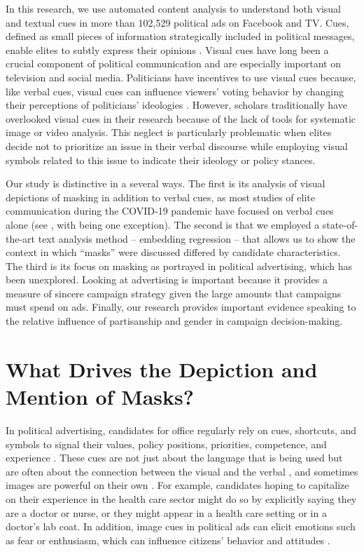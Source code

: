 In this research, we use automated content analysis to understand both visual and textual cues in more than 102,529 political ads on Facebook and TV. Cues, defined as small pieces of information strategically included in political messages, enable elites to subtly express their opinions \parencite{darmofal2005elite}. Visual cues have long been a crucial component of political communication \parencite{schill2012visual} and are especially important on television and social media. Politicians have incentives to use visual cues because, like verbal cues, visual cues can influence viewers' voting behavior by changing their perceptions of politicians' ideologies \parencite{dan_visual_2021}. However, scholars traditionally have overlooked visual cues in their research because of the lack of tools for systematic image or video analysis. This neglect is particularly problematic when elites decide not to prioritize an issue in their verbal discourse while employing visual symbols related to this issue to indicate their ideology or policy stances. 

Our study is distinctive in a several ways. The first is its analysis of visual depictions of masking in addition to verbal cues, as most studies of elite communication during the COVID-19 pandemic have focused on verbal cues alone (see \cite{green2020elusive, scoville2022mask, neumann2023politicizing}, with \cite{holman_masking_nodate} being one exception). The second is that we employed a state-of-the-art text analysis method -- embedding regression -- that allows us to show the context in which ``masks'' were discussed differed by candidate characteristics. The third is its focus on masking as portrayed in political advertising, which has been unexplored. Looking at advertising is important because it provides a measure of sincere campaign strategy given the large amounts that campaigns must spend on ads. Finally, our research provides  important evidence speaking to the relative influence of partisanship and gender in campaign decision-making.  

\section*{What Drives the Depiction and Mention of Masks?}
In political advertising, candidates for office regularly rely on cues, shortcuts, and symbols to signal their values, policy positions, priorities, competence, and experience \parencite{valentino_cues_2002,schmuck_effects_2017,FFR_2021,neumann2022body}. These cues are not just about the language that is being used but are often about the connection between the visual and the verbal \parencite{valentino2004impact, schmuck_effects_2017, swigger2012you}, and sometimes images are powerful on their own \parencite{FFR_2021,dan_visual_2021}. For example, candidates hoping to capitalize on their experience in the health care sector might do so by explicitly saying they are a doctor or nurse, or they might appear in a health care setting or in a doctor's lab coat. In addition, image cues in political ads can elicit emotions such as fear or enthusiasm, which can influence citizens' behavior and attitudes \parencite{brader2005striking}.

